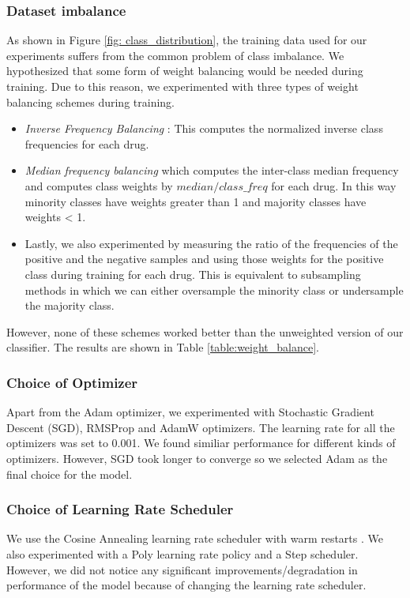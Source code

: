 \documentclass{article}
\begin{document}
\subsubsection{Dataset imbalance}
\label{section: imbalance}
As shown in Figure \ref{fig: class_distribution}, the training data used for our experiments
suffers from the common problem of class imbalance. We hypothesized
that some form of weight balancing would be needed during training. Due to this reason, we experimented with
three types of weight balancing schemes during training.
\begin{itemize}
  \item \emph{Inverse Frequency Balancing} : This computes the normalized inverse class frequencies for each drug.
  \item \emph{Median frequency balancing} which computes the inter-class median 
  frequency and computes class weights by $median / class\_freq$ for each drug. In this way minority classes have weights
  greater than 1 and majority classes have weights < 1.
  \item Lastly, we also experimented by measuring the ratio of
  the frequencies of the positive and the negative samples and using those weights for the positive class during
  training for each drug. This is equivalent to subsampling methods in which we can either oversample the minority
  class or undersample the majority class.
\end{itemize}
  However, none of these schemes worked better than the unweighted version of our classifier.
The results are shown in Table \ref{table:weight_balance}.

\subsubsection{Choice of Optimizer}
Apart from the Adam optimizer, we experimented with Stochastic Gradient Descent (SGD), RMSProp and AdamW \cite{loshchilov2019decoupled} 
optimizers. The learning rate for all the optimizers was set to 0.001. We found
similiar performance for different kinds of optimizers. However, SGD took longer to
converge so we selected Adam as the final choice for the model.

\subsubsection{Choice of Learning Rate Scheduler}
We use the Cosine Annealing learning rate scheduler with warm restarts \cite{loshchilov2017sgdr}.
We also experimented with a Poly learning rate policy and a Step scheduler. However, we did not notice
any significant improvements/degradation in performance of the model because of changing the learning rate
scheduler.
\end{document}

